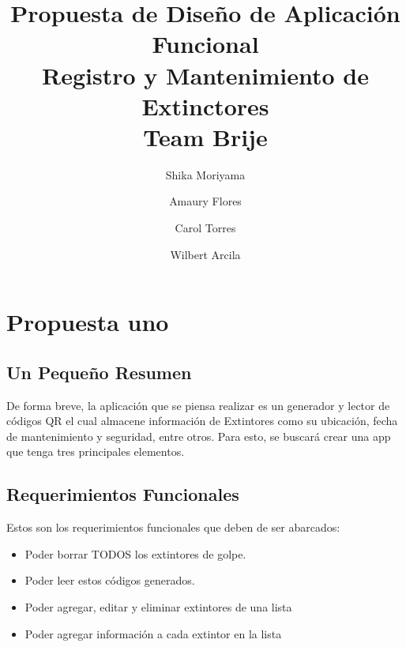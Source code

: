 \documentclass[a4paper,twoside,10pt]{report}
\begin{document}
\pagestyle{empty} %



\title{%
  Propuesta de Diseño de Aplicación Funcional\\
  \large Registro y Mantenimiento de Extinctores \\
    Team Brije}

\author{
  Shika Moriyama
  \and
  Amaury Flores
	\and
  Carol Torres
	\and
  Wilbert Arcila
}
\maketitle



\tableofcontents %
\cleardoublepage %

\chapter{Propuesta uno}

\section{Un Pequeño Resumen}

\par De forma breve, la aplicación que se piensa realizar es un generador y lector de códigos QR el cual almacene información de Extintores como su ubicación, fecha de mantenimiento y seguridad, entre otros. Para esto, se buscará crear una app que tenga tres principales elementos.

\section{Requerimientos Funcionales}

\par Estos son los requerimientos funcionales que deben de ser abarcados:
\begin{itemize}
	\item Poder borrar TODOS los extintores de golpe.
	\item Poder leer estos códigos generados.
	\item Poder agregar, editar y eliminar extintores de una lista
	\item Poder agregar información a cada extintor en la lista
\end{itemize}
\end{document}
